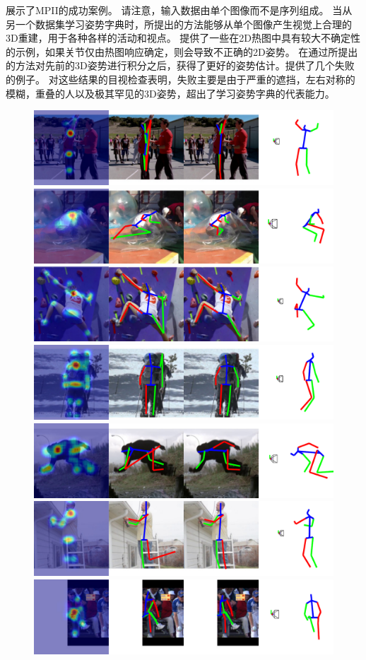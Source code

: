 展示了MPII的成功案例。 请注意，输入数据由单个图像而不是序列组成。 当从另一个数据集学习姿势字典时，所提出的方法能够从单个图像产生视觉上合理的3D重建，用于各种各样的活动和视点。 提供了一些在2D热图中具有较大不确定性的示例，如果关节仅由热图响应确定，则会导致不正确的2D姿势。 在通过所提出的方法对先前的3D姿势进行积分之后，获得了更好的姿势估计。提供了几个失败的例子。 对这些结果的目视检查表明，失败主要是由于严重的遮挡，左右对称的模糊，重叠的人以及极其罕见的3D姿势，超出了学习姿势字典的代表能力。

\begin{figure}
  \centering
  \includegraphics[width=0.48\linewidth]{figures/examples/mpii/pos-002.pdf}
  \includegraphics[width=0.48\linewidth]{figures/examples/mpii/pos-003.pdf}
  \includegraphics[width=0.48\linewidth]{figures/examples/mpii/pos-006.pdf}
  \includegraphics[width=0.48\linewidth]{figures/examples/mpii/pos-015.pdf}
  \includegraphics[width=0.48\linewidth]{figures/examples/mpii/pos-009.pdf}
  \includegraphics[width=0.48\linewidth]{figures/examples/mpii/pos-014.pdf}
  \includegraphics[width=0.48\linewidth]{figures/examples/mpii/pos-023.pdf}

\end{figure}
